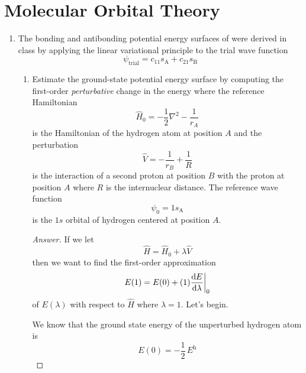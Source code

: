 \documentclass[../psets.tex]{subfiles}
\begin{document}
\section{Molecular Orbital Theory}
\begin{enumerate}
    \item {}The bonding and antibonding potential energy surfaces of  were derived in class by applying the linear variational principle to the trial wave function
    \begin{equation*}
        \psi_\text{trial} = c_11s_\text{A}+c_21s_\text{B}
    \end{equation*}
    \begin{enumerate}
        \item Estimate the ground-state potential energy surface by computing the first-order \emph{perturbative} change in the energy where the reference Hamiltonian
        \begin{equation*}
            \hat{H}_0 = -\frac{1}{2}\nabla^2-\frac{1}{r_A}
        \end{equation*}
        is the Hamiltonian of the hydrogen atom at position $A$ and the perturbation
        \begin{equation*}
            \hat{V} = -\frac{1}{r_B}+\frac{1}{R}
        \end{equation*}
        is the interaction of a second proton at position $B$ with the proton at position $A$ where $R$ is the internuclear distance. The reference wave function
        \begin{equation*}
            \psi_0 = 1s_\text{A}
        \end{equation*}
        is the $1s$ orbital of hydrogen centered at position $A$.
        \begin{proof}[Answer]
            If we let
            \begin{equation*}
                \hat{H} = \hat{H}_0+\lambda\hat{V}
            \end{equation*}
            then we want to find the first-order approximation
            \begin{equation*}
                E(1) = E(0)+(1)\dv{E}{\lambda}\bigg|_0
            \end{equation*}
            of $E(\lambda)$ with respect to $\hat{H}$ where $\lambda=1$. Let's begin.\par
            We know that the ground state energy of the unperturbed hydrogen atom is
            \begin{equation*}
                E(0) = -\frac{1}{2}\,\si{\hartree}

\end{equation*}
\end{proof}
\end{enumerate}
\end{enumerate}
\end{document}
